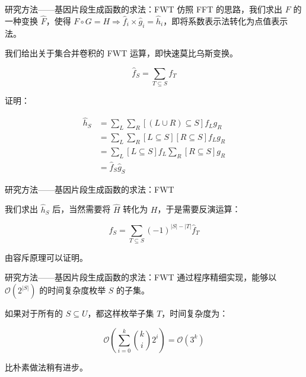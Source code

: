 \documentclass{beamer}
\begin{document}
	\begin{frame}{研究方法——基因片段生成函数的求法：FWT}
		仿照 FFT 的思路，我们求出 $F$ 的一种变换 $\hat F$，使得 $F \circ G = H \Rightarrow \hat f_i \times \hat g_i = \hat h_i$，即将系数表示法转化为点值表示法。
		
		我们给出关于集合并卷积的 FWT 运算，即快速莫比乌斯变换。
		
		$$\hat f_S=\sum_{T \subseteq S} f_T$$
		
		证明：
		
		$$
		\begin{aligned}
			\hat h_S &=\sum_{L} \sum_{R} [(L \cup R) \subseteq S] f_L g_R \\
			&= \sum_{L} \sum_{R} [L \subseteq S][R \subseteq S] f_L g_R \\
			&= \sum_{L} [L \subseteq S] f_L \sum_{R} [R \subseteq S] g_R \\
			&= \hat f_S \hat g_S
		\end{aligned}
		$$
	\end{frame}

	\begin{frame}{研究方法——基因片段生成函数的求法：FWT}
		
		我们求出 $\hat h_S$ 后，当然需要将 $\hat H$ 转化为 $H$，于是需要反演运算：
		
		$$f_S=\sum_{T \subseteq S} (-1)^{|S|-|T|}\hat f_T$$
		
		由容斥原理可以证明。
	\end{frame}

	\begin{frame}{研究方法——基因片段生成函数的求法：FWT}
		通过程序精细实现，能够以 $\mathcal O(2^{|S|})$ 的时间复杂度枚举 $S$ 的子集。
		
		如果对于所有的 $S \subseteq U$，都这样枚举子集 $T$，时间复杂度为：
		
		$$\mathcal O\left(\sum_{i=0}^k \binom{k}{i}2^i\right)= \mathcal O(3^k)$$
		
		比朴素做法稍有进步。
	\end{frame}
\end{document}
